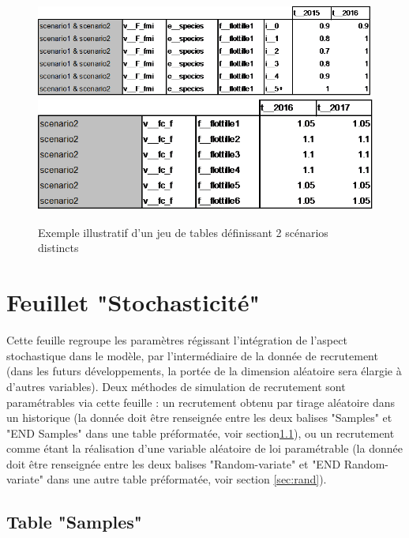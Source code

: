 \documentclass[12pt, colorinlistoftodos, notitlepage]{report}
\newenvironment{not used}[1]{%
    \longtable{%
        |>{\centering$\displaystyle}A{#1}{1}<{$}%
        |}\hline\ignorespaces}{%
    \endlongtable\ignorespacesafterend}
\begin{document}
\begin{figure}[h!]
    \begin{center}
    \includegraphics[width = 16.3cm]{figures/param/stock12.png}
    \includegraphics[width = 13.3cm]{figures/param/stock13.png}
    \end{center}
    \caption{Exemple illustratif d'un jeu de tables définissant 2 scénarios distincts}
    \label{fig:scenar}
\end{figure}


\section{Feuillet "Stochasticité"}

Cette feuille regroupe les paramètres régissant l'intégration de l'aspect stochastique dans le modèle, par l'intermédiaire de la donnée de recrutement (dans les futurs développements, la portée de la dimension aléatoire sera élargie à d'autres variables). Deux méthodes de simulation de recrutement sont paramétrables via cette feuille : un recrutement obtenu par tirage aléatoire dans un historique (la donnée doit être renseignée entre les deux balises "Samples" et "END Samples" dans une table préformatée, voir section\ref{sec:sample}), ou un recrutement comme étant la réalisation d'une variable aléatoire de loi paramétrable (la donnée doit être renseignée entre les deux balises "Random-variate" et "END Random-variate" dans une autre table préformatée, voir section \ref{sec:rand}).


\subsection{Table "Samples"} \label{sec:sample}
\end{document}
